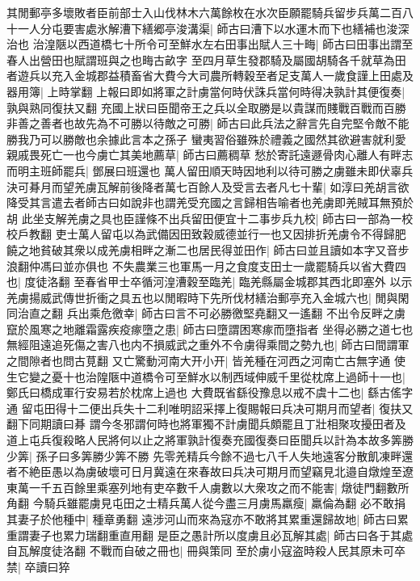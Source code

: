 其閒郵亭多壞敗者臣前部士入山伐林木六萬餘枚在水次臣願罷騎兵留步兵萬二百八十一人分屯要害處氷解漕下繕郷亭浚溝渠|{
	師古曰漕下以水運木而下也繕補也浚深治也}
治湟陿以西道橋七十所令可至鮮水左右田事出賦人三十畮|{
	師古曰田事出謂至春人出營田也賦謂班與之也畮古畝字}
至四月草生發郡騎及屬國胡騎各千就草為田者遊兵以充入金城郡益積畜省大費今大司農所轉穀至者足支萬人一歲食謹上田處及器用簿|{
	上時掌翻}
上報曰即如將軍之計虜當何時伏誅兵當何時得决孰計其便復奏|{
	孰與熟同復扶又翻}
充國上狀曰臣聞帝王之兵以全取勝是以貴謀而賤戰百戰而百勝非善之善者也故先為不可勝以待敵之可勝|{
	師古曰此兵法之辭言先自完堅令敵不能勝我乃可以勝敵也余據此言本之孫子}
蠻夷習俗雖殊於禮義之國然其欲避害就利愛親戚畏死亡一也今虜亡其美地薦草|{
	師古曰薦稠草}
愁於寄託遠遯骨肉心離人有畔志而明主班師罷兵|{
	鄧展曰班還也}
萬人留田順天時因地利以待可勝之虜雖未即伏辜兵決可朞月而望羌虜瓦解前後降者萬七百餘人及受言去者凡七十輩|{
	如淳曰羌胡言欲降受其言遣去者師古曰如說非也謂羌受充國之言歸相告喻者也羌虜即羌賊耳無預於胡}
此坐支解羌虜之具也臣謹條不出兵留田便宜十二事步兵九校|{
	師古曰一部為一校校戶教翻}
吏士萬人留屯以為武備因田致穀威德並行一也又因排折羌虜令不得歸肥饒之地貧破其衆以成羌虜相畔之漸二也居民得並田作|{
	師古曰並且讀如本字又音步浪翻仲馮曰並亦俱也}
不失農業三也軍馬一月之食度支田士一歲罷騎兵以省大費四也|{
	度徒洛翻}
至春省甲士卒循河湟漕穀至臨羌|{
	臨羌縣屬金城郡其西北即塞外}
以示羌虜揚威武傳世折衝之具五也以閒暇時下先所伐材繕治郵亭充入金城六也|{
	閒與閑同治直之翻}
兵出乘危徼幸|{
	師古曰言不可必勝徼堅堯翻又一遙翻}
不出令反畔之虜竄於風寒之地離霜露疾疫瘃墮之患|{
	師古曰墮謂困寒瘃而墮指者}
坐得必勝之道七也無經阻遠追死傷之害八也内不損威武之重外不令虜得乘間之勢九也|{
	師古曰間謂軍之間隙者也問古莧翻}
又亡驚動河南大开小开|{
	皆羌種在河西之河南亡古無字通}
使生它變之憂十也治隍陿中道橋令可至鮮水以制西域伸威千里從枕席上過師十一也|{
	鄭氏曰橋成軍行安易若於枕席上過也}
大費既省繇役豫息以戒不虞十二也|{
	繇古傜字通}
留屯田得十二便出兵失十二利唯明詔采擇上復賜報曰兵决可期月而望者|{
	復扶又翻下同期讀曰朞}
謂今冬邪謂何時也將軍獨不計虜聞兵頗罷且丁壯相聚攻擾田者及道上屯兵復殺略人民將何以止之將軍孰計復奏充國復奏曰臣聞兵以計為本故多筭勝少筭|{
	孫子曰多筭勝少筭不勝}
先零羌精兵今餘不過七八千人失地遠客分散飢凍畔還者不絶臣愚以為虜破壞可日月冀遠在來春故曰兵决可期月而望竊見北邉自燉煌至遼東萬一千五百餘里乘塞列地有吏卒數千人虜數以大衆攻之而不能害|{
	燉徒門翻數所角翻}
今騎兵雖罷虜見屯田之士精兵萬人從今盡三月虜馬羸瘦|{
	羸倫為翻}
必不敢捐其妻子於他種中|{
	種章勇翻}
遠涉河山而來為寇亦不敢將其累重還歸故地|{
	師古曰累重謂妻子也累力瑞翻重直用翻}
是臣之愚計所以度虜且必瓦解其處|{
	師古曰各于其處自瓦解度徒洛翻}
不戰而自破之冊也|{
	冊與策同}
至於虜小寇盗時殺人民其原未可卒禁|{
	卒讀曰猝}
